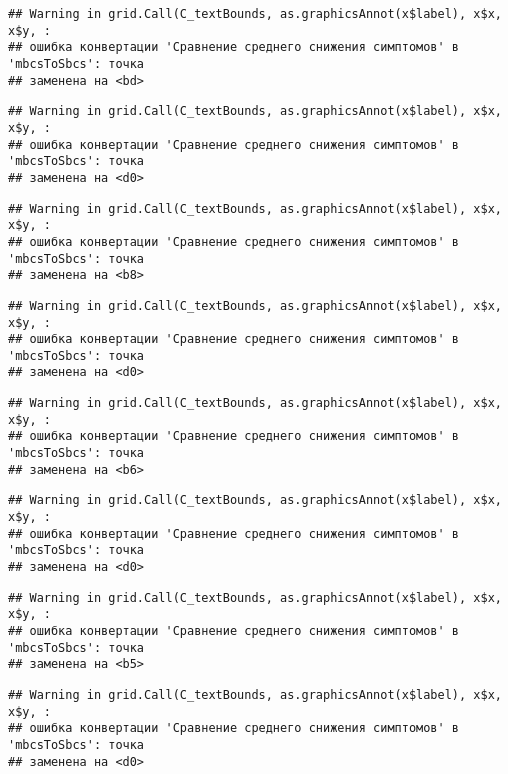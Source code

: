 \documentclass[
]{article}
\begin{document}
\begin{verbatim}
## Warning in grid.Call(C_textBounds, as.graphicsAnnot(x$label), x$x, x$y, :
## ошибка конвертации 'Сравнение среднего снижения симптомов' в 'mbcsToSbcs': точка
## заменена на <bd>
\end{verbatim}

\begin{verbatim}
## Warning in grid.Call(C_textBounds, as.graphicsAnnot(x$label), x$x, x$y, :
## ошибка конвертации 'Сравнение среднего снижения симптомов' в 'mbcsToSbcs': точка
## заменена на <d0>
\end{verbatim}

\begin{verbatim}
## Warning in grid.Call(C_textBounds, as.graphicsAnnot(x$label), x$x, x$y, :
## ошибка конвертации 'Сравнение среднего снижения симптомов' в 'mbcsToSbcs': точка
## заменена на <b8>
\end{verbatim}

\begin{verbatim}
## Warning in grid.Call(C_textBounds, as.graphicsAnnot(x$label), x$x, x$y, :
## ошибка конвертации 'Сравнение среднего снижения симптомов' в 'mbcsToSbcs': точка
## заменена на <d0>
\end{verbatim}

\begin{verbatim}
## Warning in grid.Call(C_textBounds, as.graphicsAnnot(x$label), x$x, x$y, :
## ошибка конвертации 'Сравнение среднего снижения симптомов' в 'mbcsToSbcs': точка
## заменена на <b6>
\end{verbatim}

\begin{verbatim}
## Warning in grid.Call(C_textBounds, as.graphicsAnnot(x$label), x$x, x$y, :
## ошибка конвертации 'Сравнение среднего снижения симптомов' в 'mbcsToSbcs': точка
## заменена на <d0>
\end{verbatim}

\begin{verbatim}
## Warning in grid.Call(C_textBounds, as.graphicsAnnot(x$label), x$x, x$y, :
## ошибка конвертации 'Сравнение среднего снижения симптомов' в 'mbcsToSbcs': точка
## заменена на <b5>
\end{verbatim}

\begin{verbatim}
## Warning in grid.Call(C_textBounds, as.graphicsAnnot(x$label), x$x, x$y, :
## ошибка конвертации 'Сравнение среднего снижения симптомов' в 'mbcsToSbcs': точка
## заменена на <d0>
\end{verbatim}
\end{document}
